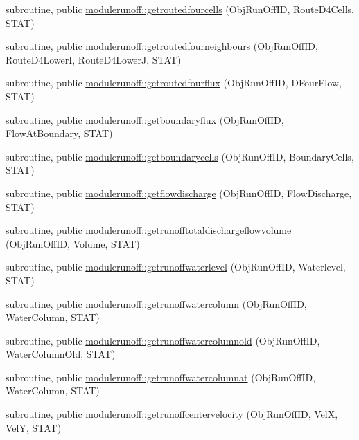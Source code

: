 \begin{DoxyCompactItemize}
\item 
subroutine, public \mbox{\hyperlink{namespacemodulerunoff_ad1eea51d0c7cb95a4e235e18dad99861}{modulerunoff\+::getroutedfourcells}} (Obj\+Run\+Off\+ID, Route\+D4\+Cells, S\+T\+AT)
\item 
subroutine, public \mbox{\hyperlink{namespacemodulerunoff_a012d41440fbbe25a6de0417a150502fd}{modulerunoff\+::getroutedfourneighbours}} (Obj\+Run\+Off\+ID, Route\+D4\+LowerI, Route\+D4\+LowerJ, S\+T\+AT)
\item 
subroutine, public \mbox{\hyperlink{namespacemodulerunoff_a8e2e0bbd121e81c889fd2cd186c45b5c}{modulerunoff\+::getroutedfourflux}} (Obj\+Run\+Off\+ID, D\+Four\+Flow, S\+T\+AT)
\item 
subroutine, public \mbox{\hyperlink{namespacemodulerunoff_aa5c3e304953e0e305461bb0ef472e0f8}{modulerunoff\+::getboundaryflux}} (Obj\+Run\+Off\+ID, Flow\+At\+Boundary, S\+T\+AT)
\item 
subroutine, public \mbox{\hyperlink{namespacemodulerunoff_a94d1c021f061e9cfa1f07c3845541525}{modulerunoff\+::getboundarycells}} (Obj\+Run\+Off\+ID, Boundary\+Cells, S\+T\+AT)
\item 
subroutine, public \mbox{\hyperlink{namespacemodulerunoff_a35dbdf0f3737830c01b78496fc043851}{modulerunoff\+::getflowdischarge}} (Obj\+Run\+Off\+ID, Flow\+Discharge, S\+T\+AT)
\item 
subroutine, public \mbox{\hyperlink{namespacemodulerunoff_aa4377dd8080b614590e0609f019f9764}{modulerunoff\+::getrunofftotaldischargeflowvolume}} (Obj\+Run\+Off\+ID, Volume, S\+T\+AT)
\item 
subroutine, public \mbox{\hyperlink{namespacemodulerunoff_a739d861fb3d51996841a644f1567506e}{modulerunoff\+::getrunoffwaterlevel}} (Obj\+Run\+Off\+ID, Waterlevel, S\+T\+AT)
\item 
subroutine, public \mbox{\hyperlink{namespacemodulerunoff_a2f62616fa000a8f027d3557454de9b24}{modulerunoff\+::getrunoffwatercolumn}} (Obj\+Run\+Off\+ID, Water\+Column, S\+T\+AT)
\item 
subroutine, public \mbox{\hyperlink{namespacemodulerunoff_a4718c4b469bb2480c20b88afa22ebc29}{modulerunoff\+::getrunoffwatercolumnold}} (Obj\+Run\+Off\+ID, Water\+Column\+Old, S\+T\+AT)
\item 
subroutine, public \mbox{\hyperlink{namespacemodulerunoff_a6f2a352071be64f678c58f0707749d4f}{modulerunoff\+::getrunoffwatercolumnat}} (Obj\+Run\+Off\+ID, Water\+Column, S\+T\+AT)
\item 
subroutine, public \mbox{\hyperlink{namespacemodulerunoff_af29a57ef10a724fc9c8e0a4f1f22339e}{modulerunoff\+::getrunoffcentervelocity}} (Obj\+Run\+Off\+ID, VelX, VelY, S\+T\+AT)

\end{DoxyCompactItemize}
